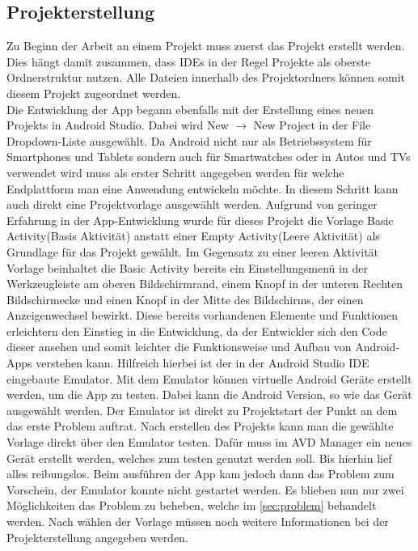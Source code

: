 \subsection{Projekterstellung}\label{subsec:projekterstellung}
Zu Beginn der Arbeit an einem Projekt muss zuerst das Projekt erstellt werden. Dies hängt damit zusammen, dass \acp{IDE} in der Regel Projekte als oberste Ordnerstruktur nutzen. Alle Dateien innerhalb des Projektordners können somit diesem Projekt zugeordnet werden.\\
Die Entwicklung der App begann ebenfalls mit der Erstellung eines neuen Projekts in Android Studio. Dabei wird \glqq New $\rightarrow$ New Project\grqq{} in der File Dropdown-Liste ausgewählt. Da Android nicht nur als Betriebssystem für Smartphones und Tablets sondern auch für Smartwatches oder in Autos und TVs verwendet wird muss als erster Schritt angegeben werden für welche Endplattform man eine Anwendung entwickeln möchte. In diesem Schritt kann auch direkt eine Projektvorlage ausgewählt werden. Aufgrund von geringer Erfahrung in der App-Entwicklung wurde für dieses Projekt die Vorlage \glqq Basic Activity\grqq (Basis Aktivität) anstatt einer \glqq Empty Activity\grqq (Leere Aktivität) als Grundlage für das Projekt gewählt. Im Gegensatz zu einer leeren Aktivität Vorlage beinhaltet die Basic Activity bereits ein Einstellungsmenü in der Werkzeugleiste am oberen Bildschirmrand, einem Knopf in der unteren Rechten Bildschirmecke und einen Knopf in der Mitte des Bildschirms, der einen Anzeigenwechsel bewirkt. Diese bereits vorhandenen Elemente und Funktionen erleichtern den Einstieg in die Entwicklung, da der Entwickler sich den Code dieser ansehen und somit leichter die Funktionsweise und Aufbau von Android-Apps verstehen kann. Hilfreich hierbei ist der in der Android Studio \ac{IDE} eingebaute Emulator. Mit dem Emulator können virtuelle Android Geräte erstellt werden, um die App zu testen. Dabei kann die Android Version, so wie das Gerät ausgewählt werden. Der Emulator ist direkt zu Projektstart der Punkt an dem das erste Problem auftrat. Nach erstellen des Projekts kann man die gewählte Vorlage direkt über den Emulator testen. Dafür muss im AVD Manager ein neues Gerät erstellt werden, welches zum testen genutzt werden soll. Bis hierhin lief alles reibungslos. Beim ausführen der App kam jedoch dann das Problem zum Vorschein, der Emulator konnte nicht gestartet werden.
Es blieben nun nur zwei Möglichkeiten das Problem zu beheben, welche im \autoref{sec:problem}  behandelt werden. Nach wählen der Vorlage müssen noch weitere Informationen bei der Projekterstellung angegeben werden.
